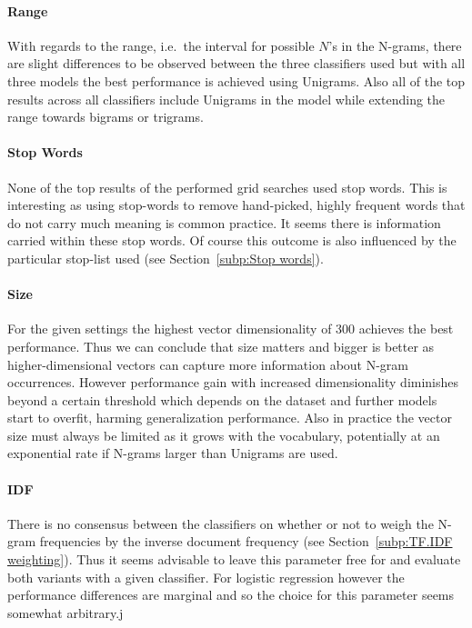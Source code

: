 \paragraph{Range}
\label{par:Range}
With regards to the range, i.e.\ the interval for possible $N$'s in the N-grams, there are slight differences to be observed between the three classifiers used but with all three models the best performance is achieved using Unigrams. Also all of the top results across all classifiers include Unigrams in the model while extending the range towards bigrams or trigrams.

\paragraph{Stop Words}
\label{par:Stop Words}
None of the top results of the performed grid searches used stop words. This is interesting as using stop-words to remove hand-picked, highly frequent words that do not carry much meaning is common practice. It seems there is information carried within these stop words. Of course this outcome is also influenced by the particular stop-list used (see Section~\ref{subp:Stop words}).

\paragraph{Size}
\label{par:Size}
For the given settings the highest vector dimensionality of 300 achieves the best performance. Thus we can conclude that size matters and bigger is better as higher-dimensional vectors can capture more information about N-gram occurrences. However performance gain with increased dimensionality diminishes beyond a certain threshold which depends on the dataset and further models start to overfit, harming generalization performance.
Also in practice the vector size must always be limited as it grows with the vocabulary, potentially at an exponential rate if N-grams larger than Unigrams are used.

\paragraph{IDF}
\label{par:IDF}
There is no consensus between the classifiers on whether or not to weigh the N-gram frequencies by the inverse document frequency (see Section~\ref{subp:TF.IDF weighting}). Thus it seems advisable to leave this parameter free for and evaluate both variants with a given classifier. For logistic regression however the performance differences are marginal and so the choice for this parameter seems somewhat arbitrary.j

